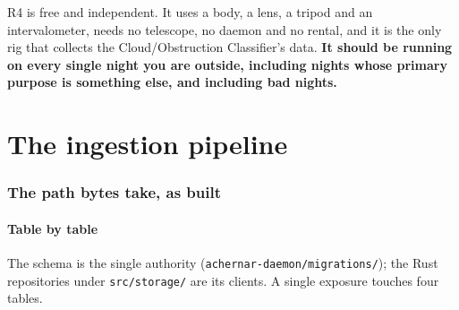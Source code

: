 \documentclass[11pt]{article}
\newcommand{\co}[1]{\texttt{\small #1}}
\begin{document}
\begin{keybox}
R4 is free and independent. It uses a body, a lens, a tripod and an
intervalometer, needs no telescope, no daemon and no rental, and it is the only
rig that collects the Cloud/Obstruction Classifier's data. \textbf{It should be
running on every single night you are outside, including nights whose primary
purpose is something else, and including bad nights.}
\end{keybox}

\part{The ingestion pipeline}

\section{The path bytes take, as built}

\subsection{Table by table}

The schema is the single authority (\co{achernar-daemon/migrations/}); the Rust
repositories under \co{src/storage/} are its clients. A single exposure touches
four tables.
\end{document}
